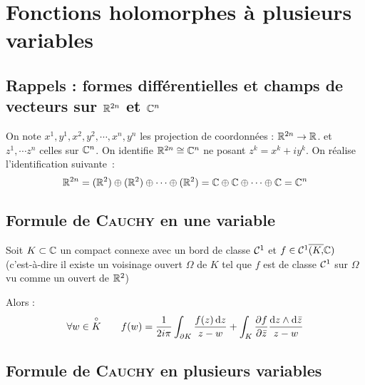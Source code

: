 \documentclass[a4paper]{book}
\begin{document}
\chapter{Fonctions holomorphes à plusieurs variables}
\section{Rappels : formes différentielles et champs de vecteurs sur $\mathbb{R}^{2n}$ et $\mathbb{C}^n$}
On note $x^1,y^1,x^2,y^2,\cdots,x^n,y^n$ les projection de coordonnées : $\mathbb{R}^{2n} \rightarrow \mathbb{R}$. et $z^1,\cdots z^n$ celles sur $\mathbb{C}^n$.
On identifie $\mathbb{R}^{2n} \cong \mathbb{C}^n$ ne posant $z^k = x^k + i y^k$.
On réalise l'identification suivante~:
\[
\mathbb{R}^{2n} = (\mathbb{R}^2) \oplus (\mathbb{R}^2) \oplus \cdots \oplus (\mathbb{R}^2) = \mathbb{C} \oplus \mathbb{C} \oplus \cdots \oplus \mathbb{C} = \mathbb{C}^n
\]
\section{Formule de \textsc{Cauchy} en une variable}
\begin{thm}
Soit $K \subset \mathbb{C}$ un compact connexe avec un bord de classe $\mathcal{C}^1$ et $f \in \mathcal{C}^1\overline{(K,}\mathbb{C})$ (c'est-à-dire il existe un voisinage ouvert $\Omega$ de $K$ tel que $f$ est de classe $\mathcal{C}^1$ sur $\Omega$ vu comme un ouvert de $\mathbb{R}^2$)

Alors :
\[
\forall w \in \overset{\circ}{K}  \qquad f(w) =\dfrac{1}{2i\pi} \int_{\partial K} \dfrac{f(z) \operatorname{d\!} z}{z-w} + 
\int_K \dfrac{\partial{f}}{\partial{\bar{z}}} \dfrac{\operatorname{d\!} z \wedge \operatorname{d\!} \bar{z}}{z-w}
\]
\end{thm}
\section{Formule de \textsc{Cauchy} en plusieurs variables}
\end{document}
